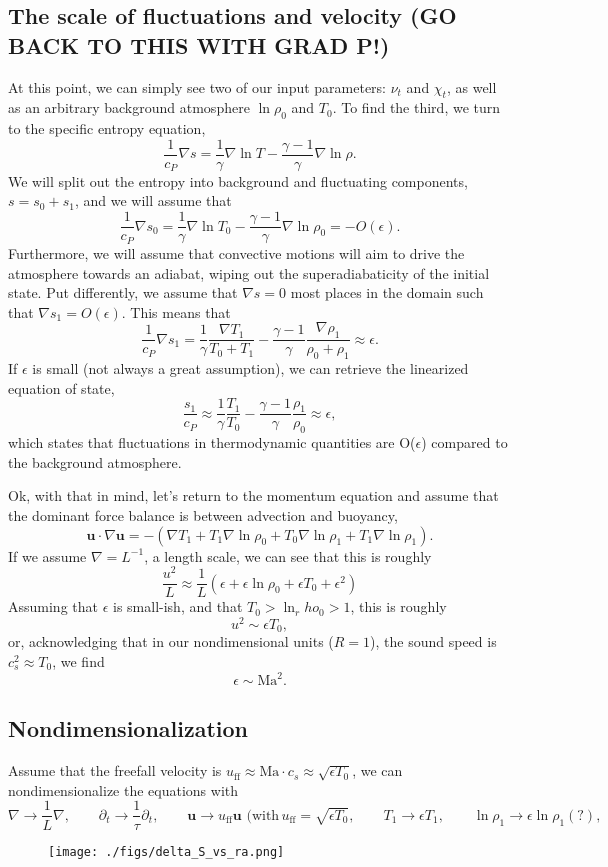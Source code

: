 \documentclass[aps, pre, onecolumn, nofootinbib, notitlepage, groupedaddress, amsfonts, amssymb, amsmath, longbibliography, superscriptaddress]{revtex4-1}
\newcommand{\grad}{\ensuremath{\nabla}}
\begin{document}
\subsection{The scale of fluctuations and velocity (GO BACK TO THIS WITH GRAD P!)}
At this point, we can simply see two of our input parameters: $\nu_t$ and $\chi_t$, as well as an arbitrary background atmosphere $\ln\rho_0$ and $T_0$.
To find the third, we turn to the specific entropy equation,
\begin{equation}
\frac{1}{c_P}\grad s = \frac{1}{\gamma}\grad\ln T - \frac{\gamma - 1}{\gamma}\grad \ln \rho.
\end{equation}
We will split out the entropy into background and fluctuating components, $s = s_0 + s_1$, and we will assume that
$$
\frac{1}{c_P}\grad s_0 = \frac{1}{\gamma}\grad\ln T_0 - \frac{\gamma - 1}{\gamma}\grad \ln \rho_0 = -O(\epsilon).
$$
Furthermore, we will assume that convective motions will aim to drive the atmosphere towards an adiabat, wiping out the superadiabaticity of the initial state.
Put differently, we assume that $\grad s = 0$ most places in the domain such that $\grad s_1 = O(\epsilon)$.
This means that
$$
\frac{1}{c_P}\grad s_1 = \frac{1}{\gamma}\frac{\grad T_1}{T_0 + T_1} - \frac{\gamma - 1}{\gamma}\frac{\grad\rho_1}{\rho_0 + \rho_1} \approx \epsilon.
$$
If $\epsilon$ is small (not always a great assumption), we can retrieve the linearized equation of state,
\begin{equation}
\frac{s_1}{c_P} \approx \frac{1}{\gamma}\frac{T_1}{T_0} - \frac{\gamma-1}{\gamma}\frac{\rho_1}{\rho_0} \approx \epsilon,
\end{equation}
which states that fluctuations in thermodynamic quantities are O($\epsilon$) compared to the background atmosphere.

Ok, with that in mind, let's return to the momentum equation and assume that the dominant force balance is between advection and buoyancy,
$$
\bm{u}\cdot\grad\bm{u} = - (\grad T_1 + T_1 \grad\ln\rho_0 + T_0 \grad\ln\rho_1 + T_1 \grad\ln\rho_1).
$$
If we assume $\grad = L^{-1}$, a length scale, we can see that this is roughly
$$
\frac{u^2}{L} \approx \frac{1}{L}\left(\epsilon + \epsilon \ln\rho_0 + \epsilon T_0 + \epsilon^2 \right)
$$
Assuming that $\epsilon$ is small-ish, and that $T_0 > \ln_rho_0 > 1$, this is roughly
$$
u^2 \sim \epsilon T_0,
$$
or, acknowledging that in our nondimensional units ($R = 1$), the sound speed is $c_s^2 \approx T_0$, we find
$$
\epsilon \sim \text{Ma}^2.
$$


\subsection{Nondimensionalization}
Assume that the freefall velocity is $u_{\text{ff}} \approx \text{Ma}\cdot c_s \approx \sqrt{\epsilon T_0}$, we can nondimensionalize the equations with
$$
\grad \rightarrow \frac{1}{L}\grad,\qquad
\partial_t \rightarrow \frac{1}{\tau}\partial_t, \qquad
\bm{u} \rightarrow u_{\text{ff}}\bm{u}\,\,(\text{with}\, u_{\text{ff}} = \sqrt{\epsilon T_0}, \qquad
T_1 \rightarrow \epsilon T_1,\qquad
\ln\rho_1 \rightarrow \epsilon\ln\rho_1 (?), \qquad
$$



\begin{figure}[p!]
\texttt{[image: ./figs/delta\_S\_vs\_ra.png]}
\caption{ 
	\label{fig:delta_S_vs_ra} }
\end{figure}
\end{document}
